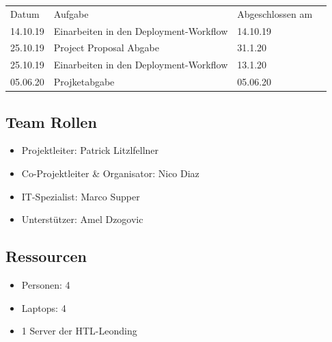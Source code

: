 \documentclass[12pt]{article}
\theoremstyle{definition}
\begin{document}
\begin{tabular}{llll}
  Datum   & Aufgabe 											& Abgeschlossen am	\\
  14.10.19 & Einarbeiten in den Deployment-Workflow		& 14.10.19			
  \\
  25.10.19 & Project Proposal Abgabe							& 31.1.20				\\
  25.10.19 &  Einarbeiten in den Deployment-Workflow					& 	13.1.20							\\
  05.06.20 & Projketabgabe										& 05.06.20
\end{tabular}

\subsection{Team Rollen}
\begin{itemize}
\item Projektleiter: Patrick Litzlfellner
\item Co-Projektleiter \& Organisator: Nico Diaz
\item IT-Spezialist: Marco Supper
\item Unterstützer: Amel Dzogovic
\end{itemize}
\subsection{Ressourcen}
\begin{itemize}
\item Personen: 4
\item Laptops: 4
\item 1 Server der HTL-Leonding
\end{itemize}
\end{document}

